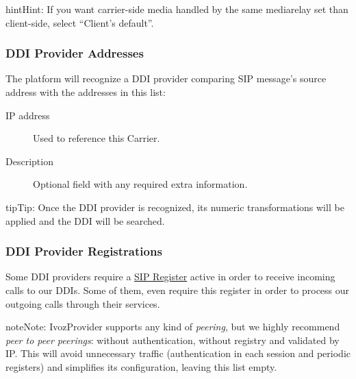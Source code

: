 \documentclass[letterpaper,10pt,english]{sphinxmanual}
\begin{document}
\begin{notice}{hint}{Hint:}
If you want carrier-side media handled by the same mediarelay set than client-side, select ``Client's default''.
\end{notice}


\subsubsection{DDI Provider Addresses}
\label{administration_portal/brand/providers/ddi_providers:ddi-provider-addresses}
The platform will recognize a DDI provider comparing SIP message's source address with the addresses in this list:
\begin{description}
\item[{IP address}] \leavevmode{}\label{administration_portal/brand/providers/ddi_providers:term-ip-address}
Used to reference this Carrier.

\item[{Description}] \leavevmode{}\label{administration_portal/brand/providers/ddi_providers:term-6}
Optional field with any required extra information.

\end{description}

\begin{notice}{tip}{Tip:}
Once the DDI provider is recognized, its numeric transformations will be applied and the DDI will be searched.
\end{notice}


\subsubsection{DDI Provider Registrations}
\label{administration_portal/brand/providers/ddi_providers:ddi-provider-registrations}
Some DDI providers require a \href{https://tools.ietf.org/html/rfc3261\#section-10}{SIP Register} active in order to receive
incoming calls to our DDIs. Some of them, even require this register in order
to process our outgoing calls through their services.

\begin{notice}{note}{Note:}
IvozProvider supports any kind of \emph{peering}, but we highly recommend
\emph{peer to peer peerings}: without authentication, without registry and
validated by IP. This will avoid unnecessary traffic (authentication in each
session and periodic registers) and simplifies its configuration, leaving this list empty.
\end{notice}
\end{document}

